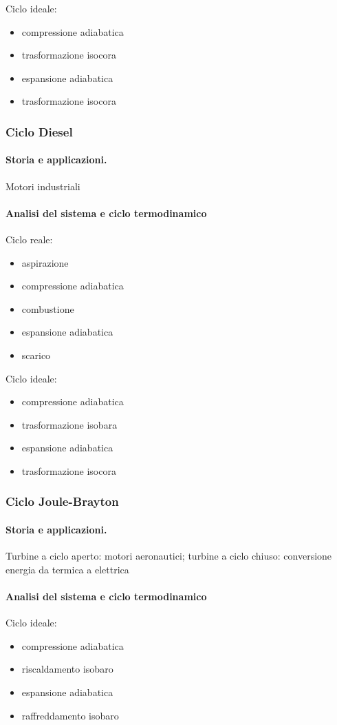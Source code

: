 Ciclo ideale:
\begin{itemize}
    \item compressione adiabatica
    \item trasformazione isocora
    \item espansione adiabatica
    \item trasformazione isocora
\end{itemize}

\subsubsection{Ciclo Diesel}
\paragraph{Storia e applicazioni.} {\color{red} Motori industriali}
\paragraph{Analisi del sistema e ciclo termodinamico}

Ciclo reale:
\begin{itemize}
    \item aspirazione
    \item compressione adiabatica
    \item combustione
    \item espansione adiabatica
    \item scarico 
\end{itemize}

Ciclo ideale:
\begin{itemize}
    \item compressione adiabatica
    \item trasformazione isobara
    \item espansione adiabatica
    \item trasformazione isocora
\end{itemize}

\subsubsection{Ciclo Joule-Brayton}
\paragraph{Storia e applicazioni.} {\color{red} Turbine a ciclo aperto: motori aeronautici; turbine a ciclo chiuso: conversione energia da termica a elettrica}
\paragraph{Analisi del sistema e ciclo termodinamico}
Ciclo ideale:
\begin{itemize}
    \item compressione adiabatica
    \item riscaldamento isobaro
    \item espansione adiabatica
    \item raffreddamento isobaro
\end{itemize}

